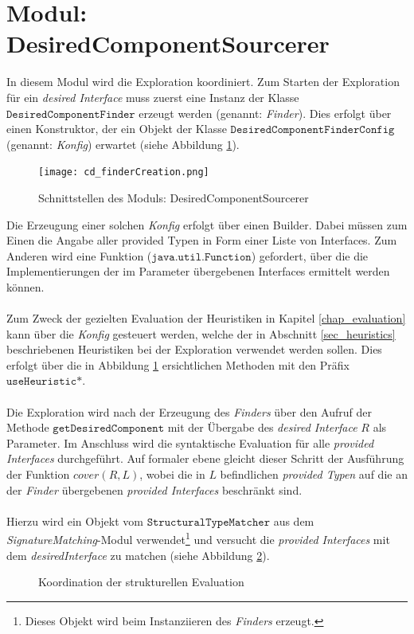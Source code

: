 \section{Modul: DesiredComponentSourcerer}
In diesem Modul wird die Exploration koordiniert. Zum Starten der Exploration für ein \emph{desired Interface} muss zuerst eine Instanz der Klasse $\texttt{DesiredComponentFinder}$ erzeugt werden (genannt: \emph{Finder}). Dies erfolgt über einen Konstruktor, der ein Objekt der Klasse $\texttt{DesiredComponentFinderConfig}$ (genannt: \emph{Konfig}) erwartet (siehe Abbildung \ref{cd_finderCreation}). 
\begin{figure}[h!]
\centering
\texttt{[image: cd\_finderCreation.png]}
\caption{Schnittstellen des Moduls: DesiredComponentSourcerer}
\label{cd_finderCreation}
\end{figure}
\noindent
Die Erzeugung einer solchen \emph{Konfig} erfolgt über einen Builder. Dabei müssen zum Einen die Angabe aller provided Typen in Form einer Liste von Interfaces. Zum Anderen wird eine Funktion ($\texttt{java.util.Function}$) gefordert, über die die Implementierungen der im Parameter übergebenen Interfaces ermittelt werden können.
\\\\
Zum Zweck der gezielten Evaluation der Heuristiken in Kapitel \ref{chap_evaluation} kann über die \emph{Konfig} gesteuert werden, welche der in Abschnitt \ref{sec_heuristics} beschriebenen Heuristiken bei der Exploration verwendet werden sollen. Dies erfolgt über die in Abbildung \ref{cd_finderCreation} ersichtlichen Methoden mit den Präfix $\texttt{useHeuristic*}$.
\\\\
Die Exploration wird nach der Erzeugung des \emph{Finders} über den Aufruf der Methode $\texttt{getDesiredComponent}$ mit der Übergabe des \emph{desired Interface} $R$ als Parameter. Im Anschluss wird die syntaktische Evaluation für alle \emph{provided Interfaces} durchgeführt. Auf formaler ebene gleicht dieser Schritt der Ausführung der Funktion $\mathit{cover(R,L)}$, wobei die in $L$ befindlichen \emph{provided Typen} auf die an der \emph{Finder} übergebenen \emph{provided Interfaces} beschränkt sind.
\\\\
Hierzu wird ein Objekt vom $\texttt{StructuralTypeMatcher}$ aus dem \emph{SignatureMatching}-Modul verwendet\footnote{Dieses Objekt wird beim Instanziieren des \emph{Finders} erzeugt.} und versucht die \emph{provided Interfaces} mit dem \emph{desiredInterface} zu matchen (siehe Abbildung \ref{sd_descos_structeval}).
\begin{figure}
\caption{Koordination der strukturellen Evaluation}
\label{sd_descos_structeval}
\end{figure}

